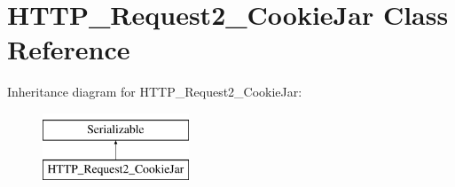\hypertarget{classHTTP__Request2__CookieJar}{}\section{H\+T\+T\+P\+\_\+\+Request2\+\_\+\+Cookie\+Jar Class Reference}
\label{classHTTP__Request2__CookieJar}
Inheritance diagram for H\+T\+T\+P\+\_\+\+Request2\+\_\+\+Cookie\+Jar\+:\begin{figure}[H]
\begin{center}
\leavevmode
\includegraphics[height=2.000000cm]{classHTTP__Request2__CookieJar}
\end{center}
\end{figure}
